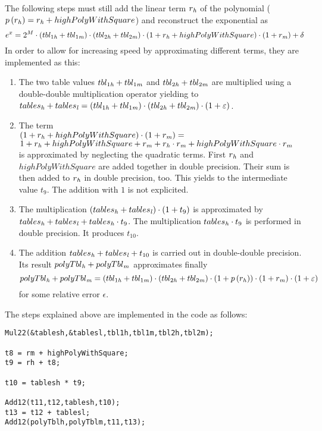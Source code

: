 The following steps must still add the linear term $r_{\mathit{h}}$ of the
polynomial ($p\left( r_{\mathit{h}} \right) = r_{\mathit{h}} + highPolyWithSquare$) and
reconstruct the exponential as
$$e^{x} = 2^M \cdot \left( tbl_{1\mathit{h}} + tbl_{1\mathit{m}} \right) \cdot
\left( tbl_{2\mathit{h}} + tbl_{2\mathit{m}} \right) \cdot \left( 1 + r_{\mathit{h}} +
highPolyWithSquare \right) \cdot \left( 1 + r_{\mathit{m}} \right) + \delta$$
In order to allow for increasing speed by approximating different
terms, they are implemented as this:
\begin{enumerate}
\item The two table values $tbl_{1\mathit{h}} + tbl_{1\mathit{m}}$ and $tbl_{2\mathit{h}} +
tbl_{2\mathit{m}}$ are multiplied using a double-double multiplication
operator yielding to $tables_{\mathit{h}} + tables_{\mathit{l}} = \left( tbl_{1\mathit{h}} +
tbl_{1\mathit{m}} \right) \cdot \left( tbl_{2\mathit{h}} + tbl_{2\mathit{m}} \right) \cdot
\left( 1 + \varepsilon \right)$.
\item The term \\
$\left( 1 + r_{\mathit{h}} + highPolyWithSquare \right) \cdot
\left( 1 + r_{\mathit{m}} \right) =$ \\ $1 + r_{\mathit{h}} + highPolyWithSquare + r_{\mathit{m}} +
r_{\mathit{h}} \cdot r_{\mathit{m}} + highPolyWithSquare \cdot r_{\mathit{m}}$ \\ is approximated
by neglecting the quadratic terms. First $r_{\mathit{h}}$ and
$highPolyWithSquare$ are added together in double precision. Their sum
is then added to $r_{\mathit{h}}$ in double precision, too.  This yields to the
intermediate value $t_9$. The addition with $1$ is not explicited.
\item The multiplication $\left( tables_{\mathit{h}} + tables_{\mathit{l}} \right) \cdot
\left( 1 + t_9 \right)$ is approximated by $tables_{\mathit{h}} + tables_{\mathit{l}} +
tables_{\mathit{h}} \cdot t_9$. The multiplication $tables_{\mathit{h}} \cdot t_9$ is
performed in double precision. It produces $t_{10}$.
\item The addition $tables_{\mathit{h}} + tables_{\mathit{l}} + t_{10}$ is carried out
in double-double precision. Its result $polyTbl_{\mathit{h}} + polyTbl_{\mathit{m}}$
approximates finally
$$polyTbl_{\mathit{h}} + polyTbl_{\mathit{m}} = \left( tbl_{1\mathit{h}} + tbl_{1\mathit{m}} \right)
\cdot \left( tbl_{2\mathit{h}} + tbl_{2\mathit{m}} \right) \cdot \left( 1 + p\left(
r_{\mathit{h}} \right) \right) \cdot \left( 1 + r_{\mathit{m}} \right) \cdot \left( 1 +
\varepsilon \right)$$
for some relative error $\epsilon$.
\end{enumerate}
The steps explained above are implemented in the code as follows:
\begin{lstlisting}[caption={Quick phase reconstruction},firstnumber=1]
Mul22(&tablesh,&tablesl,tbl1h,tbl1m,tbl2h,tbl2m);

t8 = rm + highPolyWithSquare;
t9 = rh + t8;

t10 = tablesh * t9;

Add12(t11,t12,tablesh,t10);
t13 = t12 + tablesl;
Add12(polyTblh,polyTblm,t11,t13);
\end{lstlisting}

